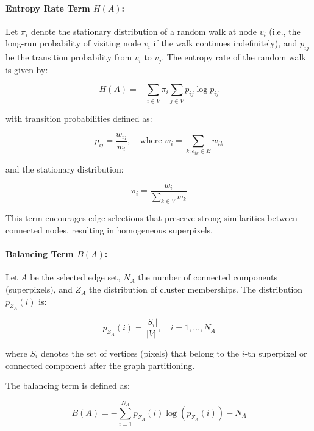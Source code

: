 \documentclass[twoside,english]{article}
\begin{document}
\paragraph{Entropy Rate Term \( H(A) \):}

Let \( \pi_i \) denote the stationary distribution of a random walk at node \( v_i \) (i.e., the long-run probability of visiting node \( v_i \) if the walk continues indefinitely), and \( p_{ij} \) be the transition probability from \( v_i \) to \( v_j \). The entropy rate of the random walk is given by:

\begin{equation}
	H(A) = - \sum_{i \in V} \pi_i \sum_{j \in V} p_{ij} \log p_{ij}
\end{equation}

with transition probabilities defined as:

\begin{equation}
	p_{ij} = \frac{w_{ij}}{w_i}, \quad \text{where } w_i = \sum_{k:e_{ik} \in E} w_{ik}
\end{equation}


and the stationary distribution:

\begin{equation}
\pi_i = \frac{w_i}{\sum_{k \in V} w_k}
\end{equation}

This term encourages edge selections that preserve strong similarities between connected nodes, resulting in homogeneous superpixels.

\paragraph{Balancing Term \( B(A) \):}

Let \( A \) be the selected edge set, \( N_A \) the number of connected components (superpixels), and \( Z_A \) the distribution of cluster memberships. The distribution \( p_{Z_A}(i) \) is:

\begin{equation}
	p_{Z_A}(i) = \frac{|S_i|}{|V|}, \quad i = 1, \dots, N_A
\end{equation}

where \( S_i \) denotes the set of vertices (pixels) that belong to the \( i \)-th superpixel or connected component after the graph partitioning.

The balancing term is defined as:

\begin{equation}
	B(A) = - \sum_{i=1}^{N_A} p_{Z_A}(i) \log(p_{Z_A}(i)) - N_A
\end{equation}
\end{document}
